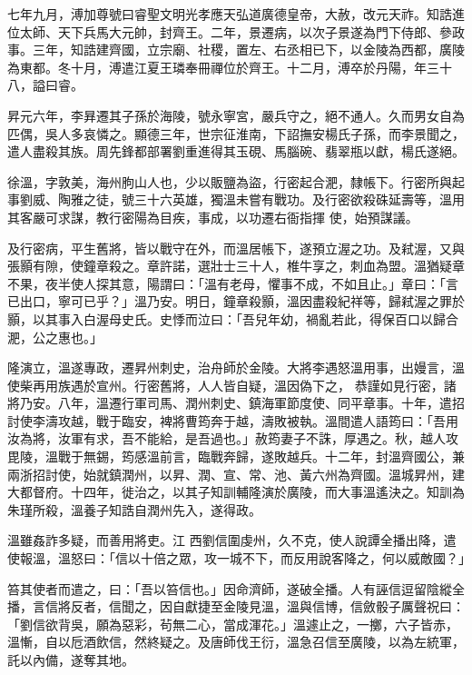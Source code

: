 \begin{pinyinscope}
 七年九月，溥加尊號曰睿聖文明光孝應天弘道廣德皇帝，大赦，改元天祚。知誥進位太師、天下兵馬大元帥，封齊王。二年，景遷病，以次子景遂為門下侍郎、參政事。三年，知誥建齊國，立宗廟、社稷，置左、右丞相已下，以金陵為西都，廣陵
 為東都。冬十月，溥遣江夏王璘奉冊禪位於齊王。十二月，溥卒於丹陽，年三十八，謚曰睿。



 昇元六年，李昪遷其子孫於海陵，號永寧宮，嚴兵守之，絕不通人。久而男女自為匹偶，吳人多哀憐之。顯德三年，世宗征淮南，下詔撫安楊氏子孫，而李景聞之，遣人盡殺其族。周先鋒都部署劉重進得其玉硯、馬腦碗、翡翠瓶以獻，楊氏遂絕。



 徐溫，字敦美，海州朐山人也，少以販鹽為盜，行密起合淝，隸帳下。行密所與起事劉威、陶雅之徒，號三十六英雄，獨溫未嘗有戰功。及行密欲殺硃延壽等，溫用其客嚴可求謀，教行密陽為目疾，事成，以功遷右衙指揮
 使，始預謀議。



 及行密病，平生舊將，皆以戰守在外，而溫居帳下，遂預立渥之功。及弒渥，又與張顥有隙，使鐘章殺之。章許諾，選壯士三十人，椎牛享之，刺血為盟。溫猶疑章不果，夜半使人探其意，陽謂曰：「溫有老母，懼事不成，不如且止。」章曰：「言已出口，寧可已乎？」溫乃安。明日，鐘章殺顥，溫因盡殺紀祥等，歸弒渥之罪於顥，以其事入白渥母史氏。史悸而泣曰：「吾兒年幼，禍亂若此，得保百口以歸合淝，公之惠也。」



 隆演立，溫遂專政，遷昇州刺史，治舟師於金陵。大將李遇怒溫用事，出嫚言，溫使柴再用族遇於宣州。行密舊將，人人皆自疑，溫因偽下之，
 恭謹如見行密，諸將乃安。八年，溫遷行軍司馬、潤州刺史、鎮海軍節度使、同平章事。十年，遣招討使李濤攻越，戰于臨安，裨將曹筠奔于越，濤敗被執。溫間遣人語筠曰：「吾用汝為將，汝軍有求，吾不能給，是吾過也。」赦筠妻子不誅，厚遇之。秋，越人攻毘陵，溫戰于無錫，筠感溫前言，臨戰奔歸，遂敗越兵。十二年，封溫齊國公，兼兩浙招討使，始就鎮潤州，以昇、潤、宣、常、池、黃六州為齊國。溫城昇州，建大都督府。十四年，徙治之，以其子知訓輔隆演於廣陵，而大事溫遙決之。知訓為朱瑾所殺，溫養子知誥自潤州先入，遂得政。



 溫雖姦詐多疑，而善用將吏。江
 西劉信圍虔州，久不克，使人說譚全播出降，遣使報溫，溫怒曰：「信以十倍之眾，攻一城不下，而反用說客降之，何以威敵國？」



 笞其使者而遣之，曰：「吾以笞信也。」因命濟師，遂破全播。人有誣信逗留陰縱全播，言信將反者，信聞之，因自獻捷至金陵見溫，溫與信博，信斂骰子厲聲祝曰：「劉信欲背吳，願為惡彩，茍無二心，當成渾花。」溫遽止之，一擲，六子皆赤，溫慚，自以卮酒飲信，然終疑之。及唐師伐王衍，溫急召信至廣陵，以為左統軍，託以內備，遂奪其地。




\end{pinyinscope}
